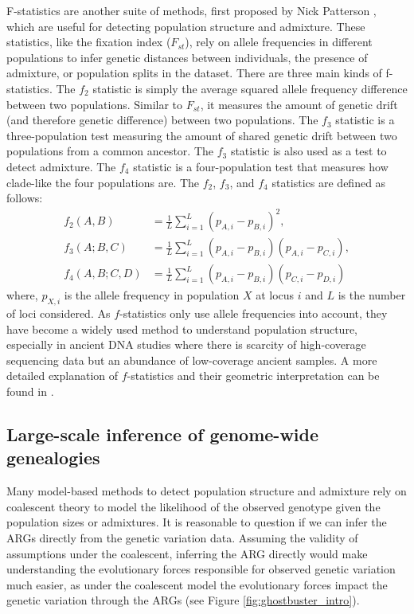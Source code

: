F-statistics are another suite of methods, first proposed by Nick Patterson \cite{reich2009reconstructing,reich2012reconstructing,patterson2012ancient,haak2015massive,durand2011testing}, which are useful for detecting population structure and admixture. These statistics, like the fixation index (\(F_{st}\)), rely on allele frequencies in different populations to infer genetic distances between individuals, the presence of admixture, or population splits in the dataset. There are three main kinds of f-statistics. The \(f_2\) statistic is simply the average squared allele frequency difference between two populations. Similar to \(F_{st}\), it measures the amount of genetic drift (and therefore genetic difference) between two populations. The \(f_3\) statistic is a three-population test measuring the amount of shared genetic drift between two populations from a common ancestor. The \(f_3\) statistic is also used as a test to detect admixture. The \(f_4\) statistic is a four-population test that measures how clade-like the four populations are. The \(f_2\), \(f_3\), and \(f_4\) statistics are defined as follows:
\begin{equation}
\begin{aligned}
    f_2(A, B) &= \frac{1}{L} \sum_{i=1}^{L} (p_{A,i} - p_{B,i})^2, \\
    f_3(A; B, C) &= \frac{1}{L} \sum_{i=1}^{L} (p_{A,i} - p_{B,i})(p_{A,i} - p_{C,i}), \\
    f_4(A, B; C, D) &= \frac{1}{L} \sum_{i=1}^{L} (p_{A,i} - p_{B,i})(p_{C,i} - p_{D,i})
\end{aligned}
\end{equation}
where, \( p_{X,i} \) is the allele frequency in population \( X \) at locus \( i \) and \( L \) is the number of loci considered. As \( f \)-statistics only use allele frequencies into account, they have become a widely used method to understand population structure, especially in ancient DNA studies where there is scarcity of high-coverage sequencing data but an abundance of low-coverage ancient samples. A more detailed explanation of \( f \)-statistics and their geometric interpretation can be found in \cite{peter2022geometric}.

\subsection{Large-scale inference of genome-wide genealogies}
\label{sec:ch1-arg-inference}
Many model-based methods to detect population structure and admixture rely on coalescent theory to model the likelihood of the observed genotype given the population sizes or admixtures. It is reasonable to question if we can infer the ARGs directly from the genetic variation data. Assuming the validity of assumptions under the coalescent, inferring the ARG directly would make understanding the evolutionary forces responsible for observed genetic variation much easier, as under the coalescent model the evolutionary forces impact the genetic variation through the ARGs (see Figure \ref{fig:ghostbuster_intro}).


